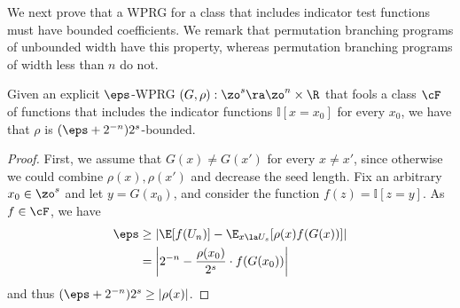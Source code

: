 \documentclass{toc}
\begin{document}
We next prove that a WPRG for a class that includes indicator test functions must have bounded coefficients. We remark that permutation branching programs %
of  %
unbounded width have this property, whereas permutation branching programs of width less
than $n$ do not. 
\begin{proposition}
  Given an explicit $\eps$-WPRG $(G,\rho):\zo^s\ra\zo^n\times \R$ that fools a
%
class $\cF$ of functions   %
that includes the indicator functions $\mathbb{I}[x=x_0]$ for every $x_0$, we have that $\rho$ is $(\eps+2^{-n})2^{s}$-bounded.
\end{proposition}
\begin{proof}
    First, we assume that $G(x)\neq G(x')$ for every $x\neq x'$, since otherwise we could combine $\rho(x),\rho(x')$ and decrease the seed length. Fix an arbitrary $x_0\in \zo^s$ and let $y=G(x_0)$, and consider the function $f(z)=\mathbb{I}[z=y]$. As $f\in \cF$, we have
    \begin{align*}
        \eps &\geq \left|\E[f(U_n)] - \E_{x\la U_s}[\rho(x)f(G(x))] \right|\\
        &= \left|2^{-n}-\frac{\rho(x_0)}{2^s}\cdot %
        f(G(x_0))\right|
    \end{align*}
    and thus $(\eps+2^{-n})2^s\geq |\rho(x)|$.
\end{proof}
\end{document}
